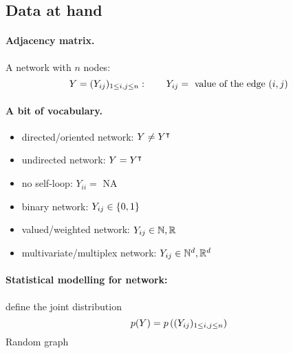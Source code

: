 \subsection{Data at hand}


\jump \paragraph{Adjacency matrix.} A network with $n$ nodes:
$$
Y = ({Y_{ij}})_{1 \leq i, j \leq n}: \qquad 
{Y_{ij}} = \text{ value of the edge } (i, j)
$$

\jump \paragraph{A bit of vocabulary.} 
\begin{itemize}
 \item directed/oriented network: $Y \neq Y^\intercal$
 \item undirected network: $Y = Y^\intercal$
 \item no self-loop: $Y_{ii} = $ NA
 \item binary network: ${Y_{ij}} \in \{0, 1\}$
 \item valued/weighted network: ${Y_{ij}} \in \mathbb{N}, \mathbb{R}$
 \item multivariate/multiplex network: ${Y_{ij}} \in \mathbb{N}^d, \mathbb{R}^d$
\end{itemize}

\jump \paragraph{Statistical modelling for network:} define the joint distribution
$$
p(Y) = p\left(({Y_{ij}})_{1 \leq i, j \leq n}\right)
$$
\ra Random graph
